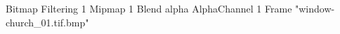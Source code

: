 {Bitmap
	{Filtering 1}
	{Mipmap 1}
	{Blend alpha}
	{AlphaChannel 1}
	{Frame "window-church_01.tif.bmp"}
}
